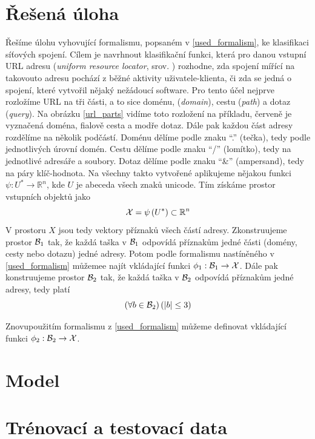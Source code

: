 \section{Řešená úloha}
Řešíme úlohu vyhovující formalismu, popsaném v \ref{used_formalism}, ke klasifikaci síťových spojení. Cílem je navrhnout klasifikační funkci, která pro danou vstupní URL adresu (\textit{\textenglish{uniform resource locator}}, srov. \cite{berners-lee_uniform_1994}) rozhodne, zda spojení mířící na takovouto adresu pochází z běžné aktivity uživatele-klienta, či zda se jedná o spojení, které vytvořil nějaký nežádoucí software. Pro tento účel nejprve rozložíme URL na tři části, a to sice doménu, (\textit{\textenglish{domain}}), cestu (\textit{\textenglish{path}}) a dotaz (\textit{\textenglish{query}}). Na obrázku \ref{url_parts} vidíme toto rozložení na příkladu, červeně je vyznačená doména, fialově cesta a modře dotaz. Dále pak každou část adresy rozdělíme na několik podčástí. Doménu dělíme podle znaku \enquote{.} (tečka), tedy podle jednotlivých úrovní domén. Cestu dělíme podle znaku \enquote{/} (lomítko), tedy na jednotlivé adresáře a soubory. Dotaz dělíme podle znaku \enquote{\&} (ampersand), tedy na páry klíč-hodnota. Na všechny takto vytvořené aplikujeme nějakou funkci \( \psi : U^* \to \mathbb R^n \), kde \( U \) je abeceda všech znaků unicode. Tím získáme prostor vstupních objektů jako
\begin{equation}
	\mathcal X = \psi \left( U^* \right) \subset \mathbb R^n
\end{equation}
V prostoru \( X \) jsou tedy vektory příznaků všech částí adresy. Zkonstruujeme prostor \( \mathcal B_1 \) tak, že každá taška v \( \mathcal B_1 \) odpovídá příznakům jedné části (domény, cesty nebo dotazu) jedné adresy. Potom podle formalismu nastíněného v \ref{used_formalism} můžemee najít vkládající funkci \( \phi_1 : \mathcal B_1 \to \mathcal X \). Dále pak konstruujeme prostor \( \mathcal B_2 \) tak, že každá taška v \( \mathcal B_2 \) odpovídá příznakům jedné adresy, tedy platí
\begin{equation}
	\left( \forall b \in \mathcal B_2 \right) \left( \left| b \right| \leq 3 \right)
\end{equation}

Znovupoužitím formalismu z \ref{used_formalism} můžeme definovat vkládající funkci \( \phi_2 : \mathcal B_2 \to \mathcal X \).

\section{Model}

\section{Trénovací a testovací data}

